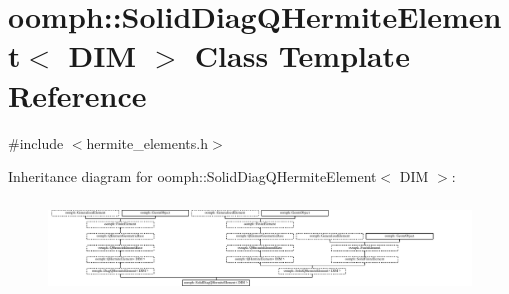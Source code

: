 \hypertarget{classoomph_1_1SolidDiagQHermiteElement}{}\section{oomph\+:\+:Solid\+Diag\+Q\+Hermite\+Element$<$ D\+IM $>$ Class Template Reference}
\label{classoomph_1_1SolidDiagQHermiteElement}


{\ttfamily \#include $<$hermite\+\_\+elements.\+h$>$}

Inheritance diagram for oomph\+:\+:Solid\+Diag\+Q\+Hermite\+Element$<$ D\+IM $>$\+:\begin{figure}[H]
\begin{center}
\leavevmode
\includegraphics[height=2.503193cm]{classoomph_1_1SolidDiagQHermiteElement}
\end{center}
\end{figure}
